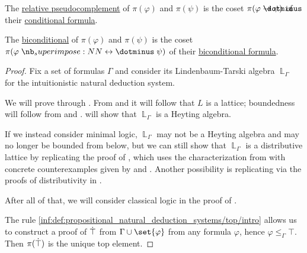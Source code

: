 \begin{proposition}
\begin{thmenum}[resume=thm:lindenbaum_tarski_algebras]
     The \hyperref[def:heyting_algebra]{relative pseudocomplement} of \( \pi(\varphi) \) and \( \pi(\psi) \) is the coset \( \pi(\varphi \synimplies \psi) \) of their \hyperref[def:propositional_alphabet/connectives/conditional]{conditional formula}.

     The \hyperref[def:heyting_algebra/biconditional]{biconditional} of \( \pi(\varphi) \) and \( \pi(\psi) \) is the coset \( \pi(\varphi \syniff \psi) \) of their \hyperref[def:propositional_alphabet/connectives/biconditional]{biconditional formula}.
  \end{thmenum}
\end{proposition}
\begin{proof}
  Fix a set of formulas \( \Gamma \) and consider its Lindenbaum-Tarski algebra \( \BbbL_\Gamma \) for the intuitionistic natural deduction system.

  We will prove  through . From  and  it will follow that \( L \) is a lattice; boundedness will follow from  and .  will show that \( \BbbL_\Gamma \) is a Heyting algebra.

  If we instead consider minimal logic, \( \BbbL_\Gamma \) may not be a Heyting algebra and may no longer be bounded from below, but we can still show that \( \BbbL_\Gamma \) is a distributive lattice by replicating the proof of , which uses the characterization from  with concrete counterexamples given by  and . Another possibility is replicating via  the proofs of distributivity in .

  After all of that, we will consider classical logic in the proof of .

   The rule \ref{inf:def:propositional_natural_deduction_systems/top/intro} allows us to construct a proof of \( \dot{\top} \) from \( \Gamma \cup \set{ \varphi } \) from any formula \( \varphi \), hence \( \varphi \leq_\Gamma \top \). Then \( \pi(\dot{\top}) \) is the unique top element.


\end{proof}
